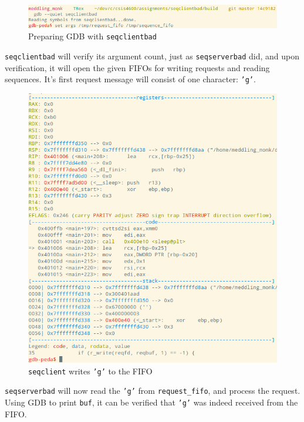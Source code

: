 \documentclass[letter,12pt,sffamily]{article}
\begin{document}
\begin{figure}[H]
	\centering
	\includegraphics[width=1\linewidth]{./images/28}
	\caption[preparing_gdb_seqclient]{Preparing GDB with \texttt{seqclientbad}}
	\label{fig:30}
\end{figure}
\texttt{seqclientbad} will verify its argument count, just as \texttt{seqserverbad} did, and upon verification, it will open
the given FIFOs for writing requests and reading sequences. It's first request message will consist of one character: \texttt{'g'}.
\begin{figure}[H]
	\centering
	\includegraphics[width=1\linewidth]{./images/29}
	\caption[write_request_fifo]{\texttt{seqclient} writes \texttt{'g'} to the FIFO}
	\label{fig:31}
\end{figure}
\texttt{seqserverbad} will now read the \texttt{'g'} from \texttt{request_fifo}, and process the request.
Using GDB to print \texttt{buf}, it can be verified that \texttt{'g'} was indeed received from the FIFO.
\end{document}
